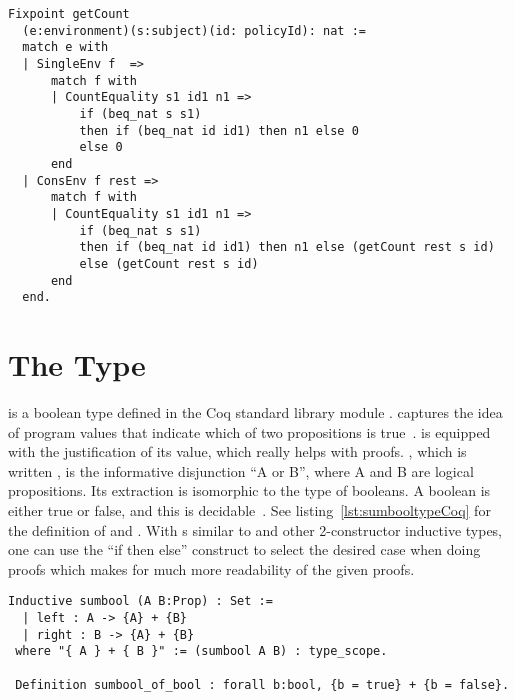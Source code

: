 \begin{minipage}[c]{0.95\textwidth}
\begin{lstlisting}
Fixpoint getCount 
  (e:environment)(s:subject)(id: policyId): nat :=
  match e with
  | SingleEnv f  => 
      match f with 
	  | CountEquality s1 id1 n1 => 
          if (beq_nat s s1) 
          then if (beq_nat id id1) then n1 else 0 
          else 0  
      end			
  | ConsEnv f rest =>
      match f with 
	  | CountEquality s1 id1 n1 => 
          if (beq_nat s s1)
          then if (beq_nat id id1) then n1 else (getCount rest s id)  
          else (getCount rest s id)
      end
  end.
\end{lstlisting}
\end{minipage}

\section{The  Type}\label{sec:sumboolsection}

 is a boolean type defined in the Coq standard library module .  captures the idea of program values that indicate which of two propositions is true~\cite{chlipalacpdt2011}.  is equipped with the justification of its value, which really helps with proofs. , which is written , is the informative disjunction ``A or B'', where A and B are logical propositions. Its extraction is isomorphic to the type of booleans. A boolean is either true or false, and this is decidable~\cite{Coq:manual}. See listing~\ref{lst:sumbooltypeCoq} for the definition of  and . With s similar to  and other 2-constructor inductive types, one can use the ``if then else'' construct to select the desired case when doing proofs which makes for much more readability of the given proofs.

\begin{minipage}[c]{0.95\textwidth}
\begin{lstlisting}
Inductive sumbool (A B:Prop) : Set :=
  | left : A -> {A} + {B}
  | right : B -> {A} + {B}
 where "{ A } + { B }" := (sumbool A B) : type_scope.
 
 Definition sumbool_of_bool : forall b:bool, {b = true} + {b = false}.
\end{lstlisting}
\end{minipage}

